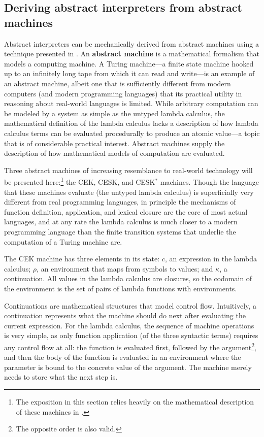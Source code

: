 \documentclass{article}
\begin{document}
\subsection{Deriving abstract interpreters from abstract machines}
Abstract interpreters can be mechanically derived from abstract machines using a technique presented in \cite{aam}. An \textbf{abstract machine} is a mathematical formalism that models a computing machine. A Turing machine---a finite state machine hooked up to an infinitely long tape from which it can read and write---is an example of an abstract machine, albeit one that is sufficiently different from modern computers (and modern programming languages) that its practical utility in reasoning about real-world languages is limited. While arbitrary computation can be modeled by a system as simple as the untyped lambda calculus, the mathematical definition of the lambda calculus lacks a description of how lambda calculus terms can be evaluated procedurally to produce an atomic value---a topic that is of considerable practical interest. Abstract machines supply the description of how mathematical models of computation are evaluated.

Three abstract machines of increasing resemblance to real-world technology will be presented here:\footnote{The exposition in this section relies heavily on the mathematical description of these machines in \cite{aam}.} the CEK, CESK, and CESK$^*$ machines. Though the language that these machines evaluate (the untyped lambda calculus) is superficially very different from real programming languages, in principle the mechanisms of function definition, application, and lexical closure are the core of most actual languages, and at any rate the lambda calculus is much closer to a modern programming language than the finite transition systems that underlie the computation of a Turing machine are.

The CEK machine has three elements in its state: $c$, an expression in the lambda calculus; $\rho$, an environment that maps from symbols to values; and $\kappa$, a continuation. All values in the lambda calculus are closures, so the codomain of the environment is the set of pairs of lambda functions with environments.

Continuations are mathematical structures that model control flow. Intuitively, a continuation represents what the machine should do next after evaluating the current expression. For the lambda calculus, the sequence of machine operations is very simple, as only function application (of the three syntactic terms) requires any control flow at all: the function is evaluated first, followed by the argument\footnote{The opposite order is also valid.}, and then the body of the function is evaluated in an environment where the parameter is bound to the concrete value of the argument. The machine merely needs to store what the next step is.
\end{document}
